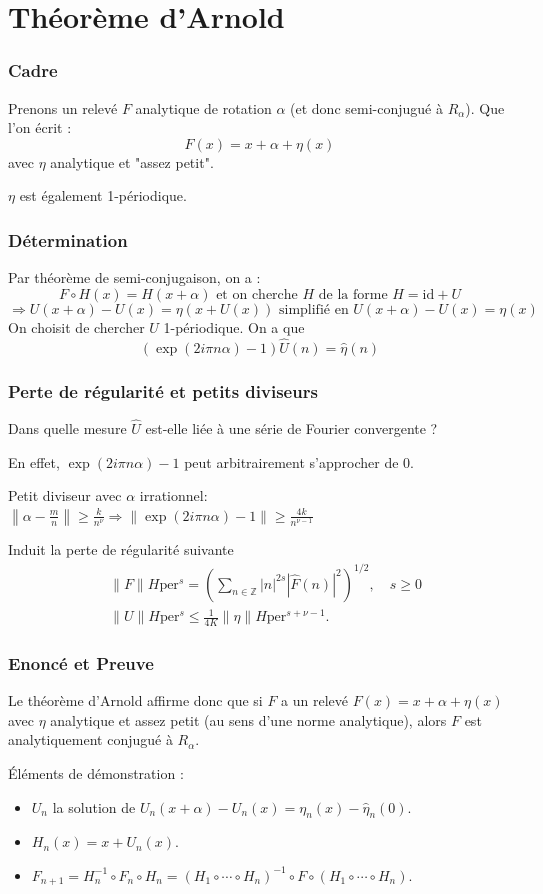 \documentclass[10pt]{beamer}
\begin{document}
\section{Théorème d'Arnold}
\begin{frame}
\frametitle{Cadre}
Prenons un relevé $F$ analytique de rotation $\alpha$ (et donc semi-conjugué à $R_\alpha$). Que l'on écrit :
\[ F(x) = x + \alpha + \eta (x) \]
avec $\eta$ analytique et "assez petit".

$\eta$ est également 1-périodique.
\end{frame}

\begin{frame}
\frametitle{Détermination}
Par théorème de semi-conjugaison, on a :
\[ F \circ H(x) = H( x + \alpha) \text{ et on cherche } H \text{ de la forme } H = \text{id} + U \]
\[ \Rightarrow U(x+ \alpha) - U(x) = \eta (x+U(x)) \text{ simplifié en } U(x+ \alpha) - U(x) = \eta (x) \]
On choisit de chercher \( U \) 1-périodique. On a que 
\[ (\exp(2 i \pi n \alpha)-1)\widehat{U} (n) = \widehat{\eta} (n) \]
\end{frame}

\begin{frame}
\frametitle{Perte de régularité et petits diviseurs}
Dans quelle mesure \( \widehat{U} \) est-elle liée à une série de Fourier convergente ?

En effet, \( \exp(2 i \pi n \alpha)-1 \) peut arbitrairement s'approcher de 0.

Petit diviseur avec \( \alpha \) irrationnel: \( \left\| \alpha - \frac{m}{n} \right\| \geq \frac{k}{n^\nu} \Rightarrow \left\| \exp(2 i \pi n \alpha)-1\right\| \geq \frac{4k}{n^{\nu-1}} \)

Induit la perte de régularité suivante
\[
\begin{aligned}
& \|F\|{H{\text{per}}^s} = \left(\sum_{n \in \mathbb{Z}}|n|^{2 s}|\hat{F}(n)|^2\right)^{1 / 2}, \quad s \geq 0 \\
& \|U\|{H{\text{per}}^s} \leq \frac{1}{4 K}\|\eta\|{H{\text{per}}^{s+\nu-1}} .
\end{aligned}
\]
\end{frame}

\begin{frame}
\frametitle{Enoncé et Preuve}
Le théorème d'Arnold affirme donc que si \( F \) a un relevé \( F(x) = x + \alpha + \eta (x) \) avec \( \eta \) analytique et assez petit (au sens d'une norme analytique), alors \( F \) est analytiquement conjugué à \( R_\alpha \).

Éléments de démonstration :
\begin{itemize}
    \item \( U_n \) la solution de \( U_n(x+\alpha)-U_n(x)=\eta_n(x)-\hat{\eta}_n(0) \).
    \item \( H_n(x)=x+U_n(x) \).
    \item \( F_{n+1}=H_n^{-1} \circ F_n \circ H_n=\left(H_1 \circ \cdots \circ H_n\right)^{-1} \circ F \circ\left(H_1 \circ \cdots \circ H_n\right) \).
\end{itemize}
\end{frame}
\end{document}
